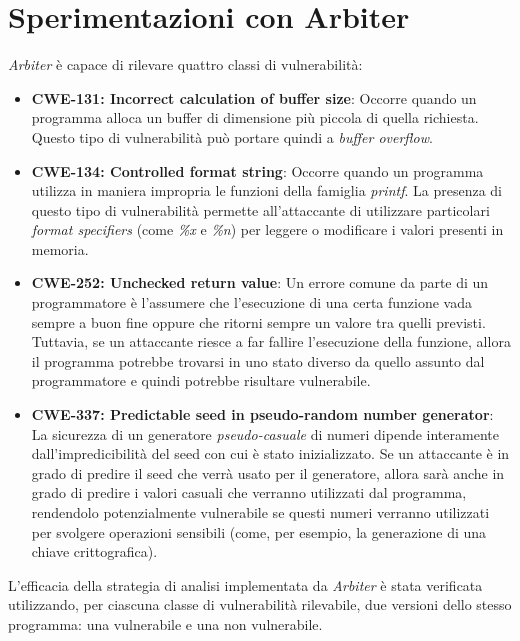 \documentclass[../main.tex]{subfiles}
\begin{document}
\section{Sperimentazioni con Arbiter}
\textit{Arbiter} è capace di rilevare quattro classi di vulnerabilità:
\begin{itemize}
    \item \textbf{CWE-131: Incorrect calculation of buffer size}: Occorre quando un programma alloca un buffer di dimensione più
    piccola di quella richiesta. Questo tipo di vulnerabilità può portare quindi a \textit{buffer overflow}.
    \item \textbf{CWE-134: Controlled format string}: Occorre quando un programma utilizza in maniera impropria le funzioni della famiglia
    \textit{printf}. La presenza di questo tipo di vulnerabilità permette all'attaccante di utilizzare particolari \textit{format specifiers} (come \textit{\%x} e \textit{\%n})
    per leggere o modificare i valori presenti in memoria.
    \item \textbf{CWE-252: Unchecked return value}: Un errore comune da parte di un programmatore è l'assumere che l'esecuzione di una certa funzione vada sempre a buon fine oppure che ritorni sempre
    un valore tra quelli previsti. Tuttavia, se un attaccante riesce a far fallire l'esecuzione della funzione, allora il programma potrebbe trovarsi in uno stato diverso da quello assunto
    dal programmatore e quindi potrebbe risultare vulnerabile.
    \item \textbf{CWE-337: Predictable seed in pseudo-random number generator}: La sicurezza di un generatore \textit{pseudo-casuale} di numeri dipende interamente dall'impredicibilità del seed con cui è stato
    inizializzato. Se un attaccante è in grado di predire il seed che verrà usato per il generatore, allora sarà anche in grado di predire i valori casuali che verranno utilizzati dal programma, rendendolo potenzialmente vulnerabile
    se questi numeri verranno utilizzati per svolgere operazioni sensibili (come, per esempio, la generazione di una chiave crittografica).
\end{itemize}
L'efficacia della strategia di analisi implementata da \textit{Arbiter} è stata verificata utilizzando, per ciascuna classe di vulnerabilità rilevabile, due versioni
dello stesso programma: una vulnerabile e una non vulnerabile.
\end{document}
